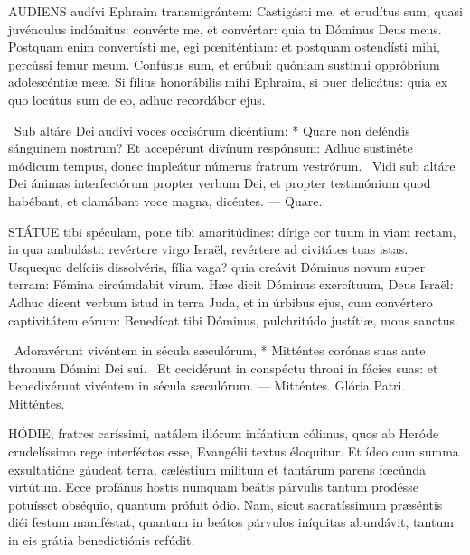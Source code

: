 
\lettrine[lines=2]{A}{UDIENS} audívi Ephraim transmigrántem: Castigásti me, et erudítus sum, quasi juvénculus indómitus: convérte me, et convértar: quia tu Dóminus Deus meus. Postquam enim convertísti me, egi pœniténtiam: et postquam ostendísti mihi, percússi femur meum. Confúsus sum, et erúbui: quóniam sustínui oppróbrium adolescéntiæ meæ. Si fílius honorábilis mihi Ephraim, si puer delicátus: quia ex quo locútus sum de eo, adhuc recordábor ejus.

\R\ Sub altáre Dei audívi voces occisórum dicéntium: * Quare non deféndis sánguinem nostrum? Et accepérunt divínum respónsum: Adhuc sustinéte módicum tempus, donec impleátur númerus fratrum vestrórum. \V\ Vidi sub altáre Dei ánimas interfectórum propter verbum Dei, et propter testimónium quod habébant, et clamábant voce magna, dicéntes. --- Quare.


\lettrine[lines=2]{S}{TÁTUE} tibi spéculam, pone tibi amaritúdines: dírige cor tuum in viam rectam, in qua ambulásti: revértere virgo Israël, revértere ad civitátes tuas istas. Usquequo delíciis dissolvéris, fília vaga? quia creávit Dóminus novum super terram: Fémina circúmdabit virum. Hæc dicit Dóminus exercítuum, Deus Israël: Adhuc dicent verbum istud in terra Juda, et in úrbibus ejus, cum convértero captivitátem eórum: Benedícat tibi Dóminus, pulchritúdo justítiæ, mons sanctus.

\R\ Adoravérunt vivéntem in sécula sæculórum, * Mitténtes corónas suas ante thronum Dómini Dei sui. \V\ Et cecidérunt in conspéctu throni in fácies suas: et benedixérunt vivéntem in sécula sæculórum. --- Mitténtes. Glória Patri. Mitténtes.





\lettrine[lines=2]{H}{ÓDIE}, fratres caríssimi, natálem illórum infántium cólimus, quos ab Heróde crudelíssimo rege interféctos esse, Evangélii textus éloquitur. Et ídeo cum summa exsultatióne gáudeat terra, cæléstium mílitum et tantárum parens fœcúnda virtútum. Ecce profánus hostis numquam beátis párvulis tantum prodésse potuísset obséquio, quantum prófuit ódio. Nam, sicut sacratíssimum præséntis diéi festum maniféstat, quantum in beátos párvulos iníquitas abundávit, tantum in eis grátia benedictiónis refúdit.

